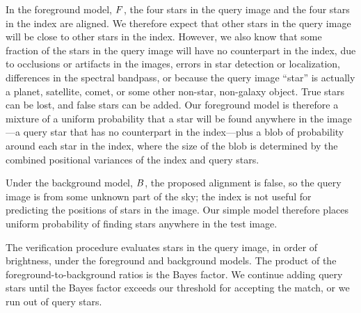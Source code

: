 
In the foreground model, $F$, the four stars in the query image and
the four stars in the index are aligned.  We therefore expect that
other stars in the query image will be close to other stars in the
index.  However, we also know that some fraction of the stars in the
query image will have no counterpart in the index, due to occlusions
or artifacts in the images, errors in star detection or localization,
differences in the spectral bandpass, or because the query image
``star'' is actually a planet, satellite, comet, or some other
non-star, non-galaxy object.  True stars can be lost, and false stars
can be added.  Our foreground model is therefore a mixture of a
uniform probability that a star will be found anywhere in the
image---a query star that has no counterpart in the index---plus a
blob of probability around each star in the index, where the size of
the blob is determined by the combined positional variances of the
index and query stars.


Under the background model, $B$, the proposed alignment is false, so
the query image is from some unknown part of the sky; the index is not
useful for predicting the positions of stars in the image.  Our simple
model therefore places uniform probability of finding stars anywhere
in the test image.  


The verification procedure evaluates stars in the query image, in
order of brightness, under the foreground and background models.  The
product of the foreground-to-background ratios is the Bayes factor.
We continue adding query stars until the Bayes factor exceeds our
threshold for accepting the match, or we run out of query stars.


